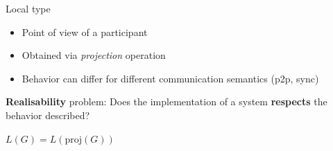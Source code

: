 \documentclass{beamer}
\begin{document}
\begin{frame}{Local type}
	\begin{itemize}
		\item Point of view of a participant
		\item Obtained via \textit{projection} operation
		\item Behavior can differ for different communication semantics (p2p, sync) 
	\end{itemize}

	\bigskip

	\textbf{Realisability} problem: Does the implementation of a system 
  \textbf{respects} the behavior described?

	\bigskip

	$L(G) = L(\text{proj}(G))$




\end{frame}

\end{document}
